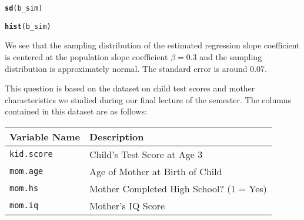\documentclass[addpoints,12pt]{exam}\usepackage[]{graphicx}\usepackage[]{color}
\makeatletter
\newcommand{\hlstd}[1]{\textcolor[rgb]{0.345,0.345,0.345}{#1}}%
\newcommand{\hlkwd}[1]{\textcolor[rgb]{0.737,0.353,0.396}{\textbf{#1}}}%
\newenvironment{kframe}{%
 \def\at@end@of@kframe{}%
 \ifinner\ifhmode%
  \def\at@end@of@kframe{\end{minipage}}%
  \begin{minipage}{\columnwidth}%
 \fi\fi%
 \def\FrameCommand##1{\hskip\@totalleftmargin \hskip-\fboxsep
 \colorbox{shadecolor}{##1}\hskip-\fboxsep
     \hskip-\linewidth \hskip-\@totalleftmargin \hskip\columnwidth}%
 \MakeFramed {\advance\hsize-\width
   \@totalleftmargin\z@ \linewidth\hsize
   \@setminipage}}%
 {\par\unskip\endMakeFramed%
 \at@end@of@kframe}
\newenvironment{knitrout}{}{} %
\makeatother
\begin{document}
\begin{questions}
\begin{parts}
\begin{solution}
\begin{knitrout}
\begin{kframe}
{\ttfamily\noindent\bfseries\color{errorcolor}{\#\# Error in mean(b\_sim): object 'b\_sim' not found}}\begin{alltt}
\hlkwd{sd}\hlstd{(b_sim)}
\end{alltt}


{\ttfamily\noindent\bfseries\color{errorcolor}{\#\# Error in is.data.frame(x): object 'b\_sim' not found}}\begin{alltt}
\hlkwd{hist}\hlstd{(b_sim)}
\end{alltt}


{\ttfamily\noindent\bfseries\color{errorcolor}{\#\# Error in hist(b\_sim): object 'b\_sim' not found}}\end{kframe}
\end{knitrout}
We see that the sampling distribution of the estimated regression slope coefficient is centered at the population slope coefficient $\beta = 0.3$ and the sampling distribution is approximately normal. The standard error is around 0.07.
\end{solution}
	\end{parts}	



\question This question is based on the dataset on child test scores and mother characteristics we studied during our final lecture of the semester. 
The columns contained in this dataset are as follows:
\begin{table}[h]
\centering
	\begin{tabular}{ll}
		Variable Name & Description\\
		\hline
		\texttt{kid.score}& Child's Test Score at Age 3\\
		\texttt{mom.age}&Age of Mother at Birth of Child\\
		\texttt{mom.hs}& Mother Completed High School? (1 = Yes)\\
		\texttt{mom.iq}& Mother's IQ Score
	\end{tabular}
\end{table}
	\begin{parts}

\end{parts}
\end{questions}
\end{document}
